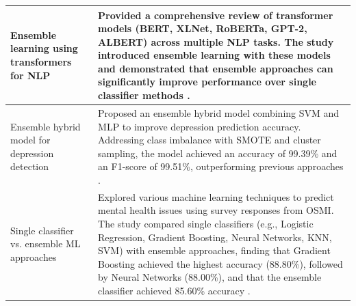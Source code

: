 \begin{table}[H]
\begin{tabularx}{\textwidth}{|p{3.5cm}|X|}
    Ensemble learning using transformers for NLP & Provided a comprehensive review of transformer models (BERT, XLNet, RoBERTa, GPT-2, ALBERT) across multiple NLP tasks. The study introduced ensemble learning with these models and demonstrated that ensemble approaches can significantly improve performance over single classifier methods \cite{Zhang_2024}. \\ \hline
    Ensemble hybrid model for depression detection & Proposed an ensemble hybrid model combining SVM and MLP to improve depression prediction accuracy. Addressing class imbalance with SMOTE and cluster sampling, the model achieved an accuracy of 99.39\% and an F1-score of 99.51\%, outperforming previous approaches \cite{Saha2024}. \\ \hline
    Single classifier vs. ensemble ML approaches & Explored various machine learning techniques to predict mental health issues using survey responses from OSMI. The study compared single classifiers (e.g., Logistic Regression, Gradient Boosting, Neural Networks, KNN, SVM) with ensemble approaches, finding that Gradient Boosting achieved the highest accuracy (88.80\%), followed by Neural Networks (88.00\%), and that the ensemble classifier achieved 85.60\% accuracy \cite{Chung_2023}. \\ \hline
\end{tabularx}
\end{table}



